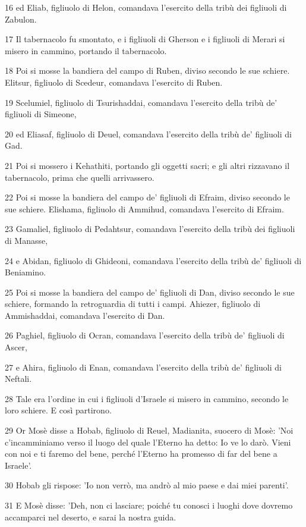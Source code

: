 \par 16 ed Eliab, figliuolo di Helon, comandava l'esercito della tribù dei figliuoli di Zabulon.
\par 17 Il tabernacolo fu smontato, e i figliuoli di Gherson e i figliuoli di Merari si misero in cammino, portando il tabernacolo.
\par 18 Poi si mosse la bandiera del campo di Ruben, diviso secondo le sue schiere. Elitsur, figliuolo di Scedeur, comandava l'esercito di Ruben.
\par 19 Scelumiel, figliuolo di Tsurishaddai, comandava l'esercito della tribù de' figliuoli di Simeone,
\par 20 ed Eliasaf, figliuolo di Deuel, comandava l'esercito della tribù de' figliuoli di Gad.
\par 21 Poi si mossero i Kehathiti, portando gli oggetti sacri; e gli altri rizzavano il tabernacolo, prima che quelli arrivassero.
\par 22 Poi si mosse la bandiera del campo de' figliuoli di Efraim, diviso secondo le sue schiere. Elishama, figliuolo di Ammihud, comandava l'esercito di Efraim.
\par 23 Gamaliel, figliuolo di Pedahtsur, comandava l'esercito della tribù dei figliuoli di Manasse,
\par 24 e Abidan, figliuolo di Ghideoni, comandava l'esercito della tribù de' figliuoli di Beniamino.
\par 25 Poi si mosse la bandiera del campo de' figliuoli di Dan, diviso secondo le sue schiere, formando la retroguardia di tutti i campi. Ahiezer, figliuolo di Ammishaddai, comandava l'esercito di Dan.
\par 26 Paghiel, figliuolo di Ocran, comandava l'esercito della tribù de' figliuoli di Ascer,
\par 27 e Ahira, figliuolo di Enan, comandava l'esercito della tribù de' figliuoli di Neftali.
\par 28 Tale era l'ordine in cui i figliuoli d'Israele si misero in cammino, secondo le loro schiere. E così partirono.
\par 29 Or Mosè disse a Hobab, figliuolo di Reuel, Madianita, suocero di Mosè: 'Noi c'incamminiamo verso il luogo del quale l'Eterno ha detto: Io ve lo darò. Vieni con noi e ti faremo del bene, perché l'Eterno ha promesso di far del bene a Israele'.
\par 30 Hobab gli rispose: 'Io non verrò, ma andrò al mio paese e dai miei parenti'.
\par 31 E Mosè disse: 'Deh, non ci lasciare; poiché tu conosci i luoghi dove dovremo accamparci nel deserto, e sarai la nostra guida.
